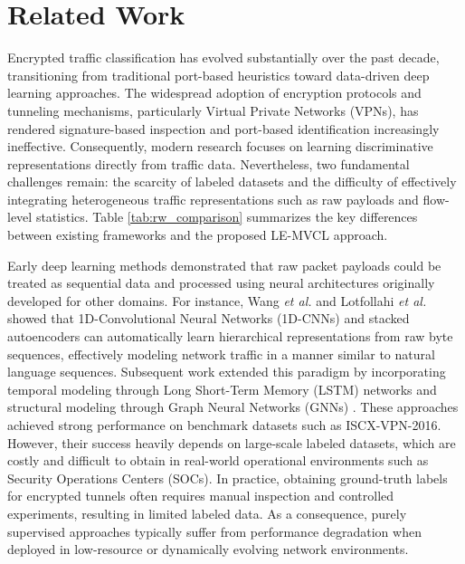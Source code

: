 \section{Related Work}
\label{sec:related_work}



Encrypted traffic classification has evolved substantially over the past decade, transitioning from traditional port-based heuristics toward data-driven deep learning approaches. The widespread adoption of encryption protocols and tunneling mechanisms, particularly Virtual Private Networks (VPNs), has rendered signature-based inspection and port-based identification increasingly ineffective. Consequently, modern research focuses on learning discriminative representations directly from traffic data. Nevertheless, two fundamental challenges remain: the scarcity of labeled datasets and the difficulty of effectively integrating heterogeneous traffic representations such as raw payloads and flow-level statistics. Table \ref{tab:rw_comparison} summarizes the key differences between existing frameworks and the proposed LE-MVCL approach.

Early deep learning methods demonstrated that raw packet payloads could be treated as sequential data and processed using neural architectures originally developed for other domains. For instance, Wang \textit{et al.} \cite{wang2017end} and Lotfollahi \textit{et al.} \cite{lotfollahi2020deep} showed that 1D-Convolutional Neural Networks (1D-CNNs) and stacked autoencoders can automatically learn hierarchical representations from raw byte sequences, effectively modeling network traffic in a manner similar to natural language sequences. Subsequent work extended this paradigm by incorporating temporal modeling through Long Short-Term Memory (LSTM) networks \cite{yao2019identification} and structural modeling through Graph Neural Networks (GNNs) \cite{huoh2022flow}. These approaches achieved strong performance on benchmark datasets such as ISCX-VPN-2016. However, their success heavily depends on large-scale labeled datasets, which are costly and difficult to obtain in real-world operational environments such as Security Operations Centers (SOCs). In practice, obtaining ground-truth labels for encrypted tunnels often requires manual inspection and controlled experiments, resulting in limited labeled data. As a consequence, purely supervised approaches typically suffer from performance degradation when deployed in low-resource or dynamically evolving network environments.

